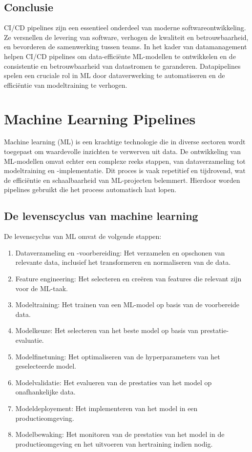 \subsection{Conclusie}

CI/CD pipelines zijn een essentieel onderdeel van moderne softwareontwikkeling. Ze versnellen de levering van software, verhogen de kwaliteit en betrouwbaarheid, en bevorderen de samenwerking tussen teams. In het kader van datamanagement helpen CI/CD pipelines om data-efficiënte ML-modellen te ontwikkelen en de consistentie en betrouwbaarheid van datastromen te garanderen. Datapipelines spelen een cruciale rol in ML door dataverwerking te automatiseren en de efficiëntie van modeltraining te verhogen.
\section{Machine Learning Pipelines}

Machine learning (ML) is een krachtige technologie die in diverse sectoren wordt toegepast om waardevolle inzichten te verwerven uit data\autocite{Jordan2015}. De ontwikkeling van ML-modellen omvat echter een complexe reeks stappen, van dataverzameling tot modeltraining en -implementatie. Dit proces is vaak repetitief en tijdrovend, wat de efficiëntie en schaalbaarheid van ML-projecten belemmert. Hierdoor worden pipelines gebruikt die het process automatisch laat lopen.

\subsection{De levenscyclus van machine learning}

De levenscyclus van ML omvat de volgende stappen:
\begin{enumerate}[label=\arabic*.]
    \item Dataverzameling en -voorbereiding: Het verzamelen en opschonen van relevante data, inclusief het transformeren en normaliseren van de data.
    \item Feature engineering: Het selecteren en creëren van features die relevant zijn voor de ML-taak.
    \item Modeltraining: Het trainen van een ML-model op basis van de voorbereide data.
    \item Modelkeuze: Het selecteren van het beste model op basis van prestatie-evaluatie.
    \item Modelfinetuning: Het optimaliseren van de hyperparameters van het geselecteerde model.
    \item Modelvalidatie: Het evalueren van de prestaties van het model op onafhankelijke data.
    \item Modeldeployement: Het implementeren van het model in een productieomgeving.
    \item Modelbewaking: Het monitoren van de prestaties van het model in de productieomgeving en het uitvoeren van hertraining indien nodig.
\end{enumerate}

